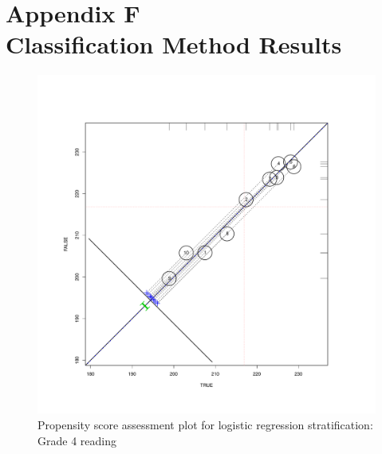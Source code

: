 \clearpage
{}
\section*{Appendix F\\Classification Method Results}

\begin{figure}[h!]
\begin{center}
\includegraphics[height=.4\textheight,width=.4\textheight]{../Figures2009/g4read-circpsa10.pdf}
\caption{Propensity score assessment plot for logistic regression stratification: Grade 4 reading}
\end{center}
\end{figure}



\clearpage

